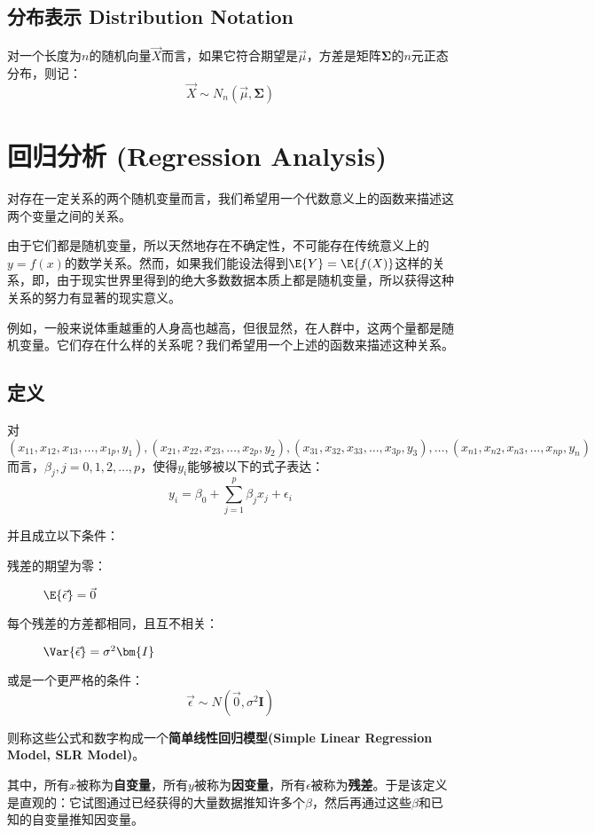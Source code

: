 \documentclass{MGLSA-cn-book-math}
\begin{document}
\section{分布表示 Distribution Notation}
对一个长度为$n$的随机向量$\vec{X}$而言，如果它符合期望是$\vec{\mu}$，方差是矩阵$\bm{\Sigma}$的$n$元正态分布，则记：
\[
	\vec{X}\sim N_n(\vec{\mu}, \bm{\Sigma})
\]

\chapter{回归分析 (Regression Analysis)}
对存在一定关系的两个随机变量而言，我们希望用一个代数意义上的函数来描述这两个变量之间的关系。

由于它们都是随机变量，所以天然地存在不确定性，不可能存在传统意义上的$y=f(x)$的数学关系。然而，如果我们能设法得到$\E{Y}=\E{f(X)}$这样的关系，即，由于现实世界里得到的绝大多数数据本质上都是随机变量，所以获得这种关系的努力有显著的现实意义。

例如，一般来说体重越重的人身高也越高，但很显然，在人群中，这两个量都是随机变量。它们存在什么样的关系呢？我们希望用一个上述的函数来描述这种关系。

\section{定义}
对$(x_{11},x_{12}, x_{13}, \dots, x_{1p},y_1),(x_{21}, x_{22}, x_{23}, \dots, x_{2p}, y_2),(x_{31},x_{32}, x_{33}, \dots, x_{3p}, y_3), \dots,(x_{n1}, x_{n2}, x_{n3}, \dots, x_{np},y_n)$而言，$\beta_j, j=0,1,2,\dots, p$，使得$y_i$能够被以下的式子表达：
\[
y_i=\beta_0+\sum_{j=1}^p\beta_jx_j+\epsilon_i
\]

并且成立以下条件：
\begin{description}
	\item [残差的期望为零：]$\E{\vec{\epsilon}}=\vec{0}$
	\item [每个残差的方差都相同，且互不相关：]$\Var{\vec{\epsilon}}=\sigma^2\bm{I}$
\end{description}

或是一个更严格的条件：
\[
	\vec{\epsilon}\sim N(\vec{0}, \sigma^2\bm{I})
\]

则称这些公式和数字构成一个\textbf{简单线性回归模型(Simple Linear Regression Model, SLR Model)}。

其中，所有$x$被称为\textbf{自变量}，所有$y$被称为\textbf{因变量}，所有$\epsilon$被称为\textbf{残差}。于是该定义是直观的：它试图通过已经获得的大量数据推知许多个$\beta$，然后再通过这些$\beta$和已知的自变量推知因变量。
\end{document}
